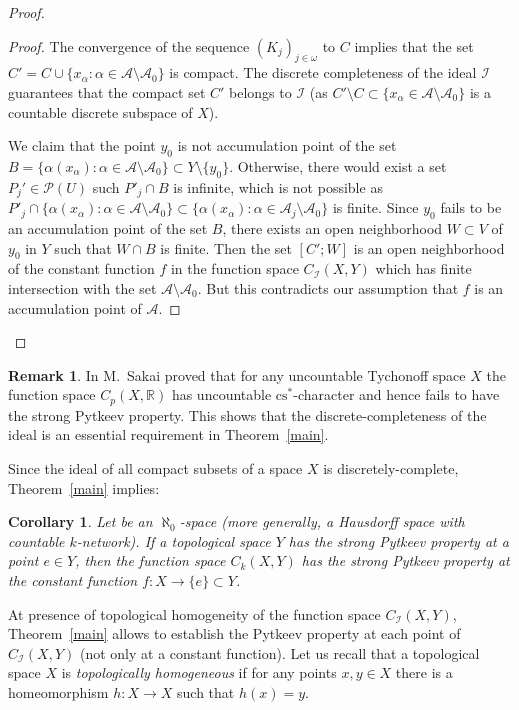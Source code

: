 \documentclass{amsart}
\newtheorem{corollary}[theorem]{Corollary}
\theoremstyle{definition}
\newtheorem{remark}[theorem]{Remark}
\begin{document}
\begin{proof}
\begin{proof}
The convergence of the sequence $(K_j)_{j\in{\omega}}$ to $C$ implies that the set $C'=C\cup\{x_\alpha:\alpha\in{\mathcal A}\setminus{\mathcal A}_0\}$ is compact. The discrete completeness of the ideal ${\mathcal I}$ guarantees that the compact set $C'$ belongs to ${\mathcal I}$ (as $C'\setminus C\subset \{x_\alpha\in{\mathcal A}\setminus{\mathcal A}_0\}$ is a countable discrete subspace of $X$).

We claim that the point $y_0$ is not accumulation point of the set $B=\{\alpha(x_\alpha):\alpha\in{\mathcal A}\setminus{\mathcal A}_0\}\subset Y\setminus\{y_0\}$. Otherwise, there would exist a set $P_j'\in\mathcal P(U)$ such
$P'_j\cap B$ is infinite, which is not possible as $P'_j\cap\{\alpha(x_\alpha):\alpha\in{\mathcal A}\setminus{\mathcal A}_0\}\subset\{\alpha(x_\alpha):\alpha\in{\mathcal A}_j\setminus{\mathcal A}_0\}$ is finite. Since $y_0$ fails to be an accumulation point of the set $B$, there exists an open neighborhood $W\subset V$ of $y_0$ in $Y$ such that $W\cap B$ is finite. Then the set $[C';W]$ is an open neighborhood of the constant function $f$ in the function space $C_{\mathcal I}(X,Y)$ which has finite intersection with the set ${\mathcal A}\setminus{\mathcal A}_0$. But this contradicts our assumption that $f$ is an accumulation point of ${\mathcal A}$.
\end{proof}
\end{proof}

\begin{remark} In \cite{MSak2} M.~Sakai proved that for any uncountable Tychonoff space $X$ the function space $C_p(X,{\mathbb R})$ has uncountable ${\mathrm{cs}}^*$-character and hence fails to have the strong Pytkeev property. This shows that the discrete-completeness of the ideal is an essential requirement in Theorem~\ref{main}.
\end{remark}

Since the ideal of all compact subsets of a space $X$ is discretely-complete, Theorem~\ref{main} implies:

\begin{corollary}\label{c:main}  Let be an $\aleph_0$-space (more generally, a Hausdorff space with countable $k$-network). If a topological space $Y$ has the strong Pytkeev property at a point $e\in Y$, then the function space $C_k(X,Y)$ has the strong Pytkeev property at the constant function $f:X\to\{e\}\subset Y$.
\end{corollary}

At presence of topological homogeneity of the function space $C_{\mathcal I}(X,Y)$, Theorem~\ref{main} allows to establish the Pytkeev property at each point of $C_{\mathcal I}(X,Y)$ (not only at a constant function).
Let us recall that a topological space $X$ is {\em topologically homogeneous} if for any points $x,y\in X$ there is a homeomorphism $h:X\to X$ such that $h(x)=y$.
\end{document}
